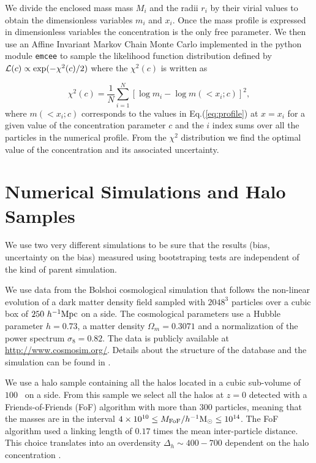 \documentclass{emulateapj}
\newcommand{\hMpc}{{\ifmmode{h^{-1}{\rm Mpc}}\else{$h^{-1}$Mpc}\fi}}
\newcommand{\hMsun}{{\ifmmode{h^{-1}{\rm {M_{\odot}}}}\else{$h^{-1}{\rm{M_{\odot}}}$}\fi}}
\begin{document}
We divide the enclosed mass mass $M_i$ and the radii $r_i$ by their
virial values to obtain the dimensionless variables $m_i$ and $x_i$.
Once the mass profile is expressed in dimensionless variables the
concentration is the only free parameter.  
We then use an Affine Invariant Markov Chain Monte Carlo implemented
in the python module {\texttt{emcee}} \citep{emcee} to sample the
likelihood function distribution defined by ${\cal L}(c)\propto
\exp(-\chi^2(c)/2)$ where the $\chi^2(c)$ is written as 

\begin{equation}
\chi^2(c)= \frac{1}{N}\sum_{i=1}^{N}[\log m_i - \log m(< x_i;c)]^2,
\end{equation}
%
where $m(<x_i;c)$ corresponds to the values in Eq.(\ref{eq:profile})
at $x=x_i$ for a given value of the concentration parameter $c$ and
the $i$ index sums over all the particles in the numerical profile.
From the $\chi^2$ distribution we find the optimal value of the
concentration and its associated uncertainty.


\section{Numerical Simulations and Halo Samples}

We use two very different simulations to be sure that the results (bias,
uncertainty on the bias) measured using bootstraping tests are
independent of the kind of parent simulation.

We use data from the Bolshoi cosmological simulation that follows the
non-linear evolution of a dark matter density field sampled with
$2048^3$ particles over a cubic box of $250\ \hMpc$ on a side.  
The cosmological parameters use a Hubble parameter $h=0.73$, a matter density
$\Omega_m=0.3071$ and a normalization of the power spectrum
$\sigma_8=0.82$. 
The data is publicly available at \url{http://www.cosmosim.org/}.  
Details about the structure of the database and the simulation can be
found in \citep{2013AN....334..691R}.

We use a halo sample containing all the halos located in a cubic
sub-volume of $100$ \hMpc\ on a side.  
From this sample we select all the halos at $z=0$ detected with a
Friends-of-Friends (FoF) algorithm with more than 300 particles,
meaning that the masses are in the interval $4\times 10^{10}\leq
M_{\rm FoF}/\hMsun \leq 10^{14}$.  The FoF algorithm used a linking
length of $0.17$ times the mean inter-particle distance. 
This choice translates into an overdensity $\Delta_h\sim 400-700$
dependent on the halo concentration \citep{More2011}.  
\end{document}
